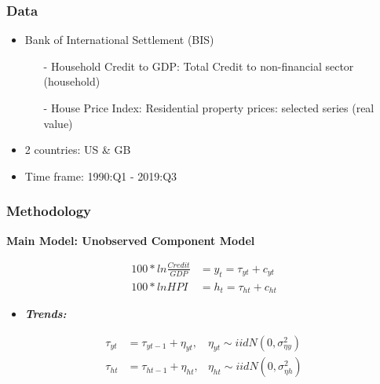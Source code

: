 \documentclass[10pt]{beamer}
\begin{document}
\begin{frame} 
	\frametitle{Data}
	
	\begin{itemize}	
		\item Bank of International Settlement (BIS)
		\begin{itemize}
			\item[-] Household Credit to GDP: Total Credit to non-financial sector (household)
			\item[-] House Price Index: Residential property prices: selected series (real value)
		\end{itemize}
	
		\item 2 countries: US \& GB
		\item Time frame: 1990:Q1 - 2019:Q3 
		
	\end{itemize}
	
	
	
	
\end{frame}

\begin{frame} 
	\frametitle{Methodology}
	
	\textbf{Main Model: Unobserved Component Model}
	

\begin{align}
	100*ln \frac{Credit}{GDP} &= y_t = \tau_{yt} + c_{yt}
	\\
	100*ln HPI &= h_t = \tau_{ht} + c_{ht}
\end{align}

	\begin{itemize}
	\item\textbf{\textit{Trends:}}
	\end{itemize}
	\begin{align}
		\tau_{yt} &= \tau_{yt-1} + \eta_{yt}, &\eta_{yt} \sim iidN(0,\sigma^2_{\eta y})
		\\
		\tau_{ht} &= \tau_{ht-1} + \eta_{ht}, &\eta_{ht} \sim iidN(0,\sigma^2_{\eta h})	
	\end{align}
	
\end{frame}
\end{document}
